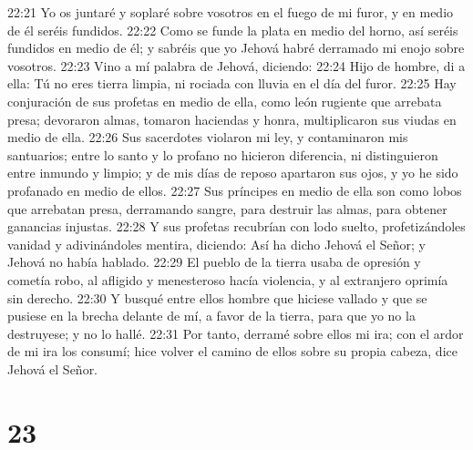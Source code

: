 22:21 Yo os juntaré y soplaré sobre vosotros en el fuego de mi furor, y en medio de él seréis fundidos.  
22:22 Como se funde la plata en medio del horno, así seréis fundidos en medio de él; y sabréis que yo Jehová habré derramado mi enojo sobre vosotros.  
22:23 Vino a mí palabra de Jehová, diciendo:  
22:24 Hijo de hombre, di a ella: Tú no eres tierra limpia, ni rociada con lluvia en el día del furor.  
22:25 Hay conjuración de sus profetas en medio de ella, como león rugiente que arrebata presa; devoraron almas, tomaron haciendas y honra, multiplicaron sus viudas en medio de ella.  
22:26 Sus sacerdotes violaron mi ley, y contaminaron mis santuarios; entre lo santo y lo profano no hicieron diferencia, ni distinguieron entre inmundo y limpio;  y de mis días de reposo apartaron sus ojos, y yo he sido profanado en medio de ellos.  
22:27 Sus príncipes en medio de ella son como lobos que arrebatan presa, derramando sangre, para destruir las almas, para obtener ganancias injustas.  
22:28 Y sus profetas recubrían con lodo suelto, profetizándoles vanidad y adivinándoles mentira, diciendo: Así ha dicho Jehová el Señor; y Jehová no había hablado.  
22:29 El pueblo de la tierra usaba de opresión y cometía robo, al afligido y menesteroso hacía violencia, y al extranjero oprimía sin derecho.  
22:30 Y busqué entre ellos hombre que hiciese vallado y que se pusiese en la brecha delante de mí, a favor de la tierra, para que yo no la destruyese; y no lo hallé.  
22:31 Por tanto, derramé sobre ellos mi ira; con el ardor de mi ira los consumí; hice volver el camino de ellos sobre su propia cabeza, dice Jehová el Señor.  

\chapter{23}

